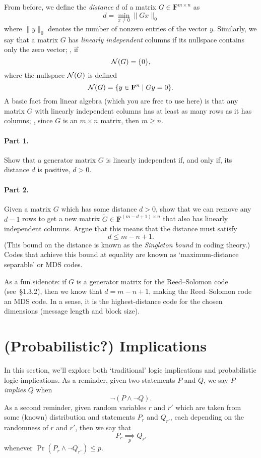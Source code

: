 \documentclass[12pt]{article}
\newcommand{\field}{\mathbf{F}}
\newcommand{\impliesn}[1]{\underset{#1}{\implies}}
\newcommand{\impliesp}{\impliesn{p}}
\begin{document}
From before, we define the \emph{distance} $d$ of a matrix $G \in \field^{m\times n}$
as
\[
    d = \min_{x \ne 0} \|Gx\|_0
\]
where $\|y\|_0$ denotes the number of nonzero entries of the vector $y$.
Similarly, we say that a matrix $G$ has \emph{linearly independent} columns if
its nullspace contains only the zero vector; \ie, if
\[
    {\mathcal N}(G) = \{0\},
\]
where the nullspace ${\mathcal N}(G)$ is defined
\[
    \nullspace(G) = \{y \in \field^n \mid Gy = 0\}.
\]
A basic fact from linear algebra (which you are free to use here) is that any
matrix $G$ with linearly independent columns has at least as many rows as it
has columns; \ie, since $G$ is an $m\times n$ matrix, then $m \ge n$.

\paragraph{Part 1.} Show that a generator matrix $G$ is linearly independent
if, and only if, its distance $d$ is positive, $d > 0$.

\paragraph{Part 2.} Given a matrix $G$ which has some distance $d > 0$, show
that we can remove any $d-1$ rows to get a new matrix $\tilde G \in
\field^{(m-d + 1)\times n}$ that also has linearly independent columns. Argue that
this means that the distance must satisfy
\[
    d \le m - n + 1.
\]
(This bound on the distance is known as the \emph{Singleton bound} in coding
theory.) Codes that achieve this bound at equality are known as
`maximum-distance separable' or MDS codes.

As a fun sidenote: if $G$ is a generator matrix for the Reed--Solomon code
(see~\S1.3.2), then we know that $d = m - n + 1$, making the Reed--Solomon code
an MDS code. In a sense, it is the highest-distance code for the chosen
dimensions (message length and block size).

\section{(Probabilistic?) Implications}
In this section, we'll explore both `traditional' logic implications
and probabilistic logic implications. As a reminder, given two statements
$P$ and $Q$, we say $P$ \emph{implies} $Q$ when
\begin{equation}\label{eq:implication}
    \neg(P \wedge \neg Q).
\end{equation}
As a second reminder, given random variables $r$ and $r'$ which are taken
from some (known) distribution and statements $P_r$ and $Q_{r'}$, each
depending on the randomness of $r$ and $r'$, then we say that
\[
    P_r \impliesp Q_{r'}
\]
whenever $\Pr(P_r \wedge \neg Q_{r'}) \le p$.
\end{document}
